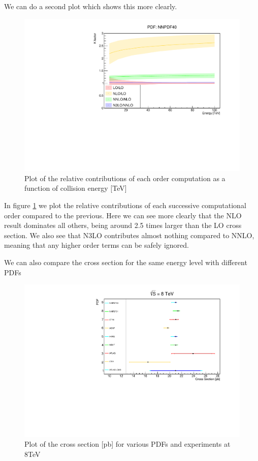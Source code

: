 \documentclass[EPJ,twocolumn]{webofc}
\begin{document}
We can do a second plot which shows this more clearly.

\begin{figure}[ht]
    \centering
    \includegraphics[width=.8\columnwidth]{Images/NNPDF40_K.pdf}
    \caption{Plot of the relative contributions of each order computation as a function of collision energy [TeV] }
    \label{results2}
\end{figure}

In figure \ref{results2} we plot the relative contributions of each successive computational order compared to the previous. Here we can see more clearly that the NLO result dominates all others, being around 2.5 times larger than the LO cross section. We also see that N3LO contributes almost nothing compared to NNLO, meaning that any higher order terms can be safely ignored.

We can also compare the cross section for the same energy level with different PDFs

\begin{figure}[ht]
    \centering
    \includegraphics[width=.8\columnwidth]{Images/Graph2.pdf}
    \caption{Plot of the cross section [pb] for various PDFs and experiments at 8TeV}
    \label{results3}
\end{figure}
\end{document}
